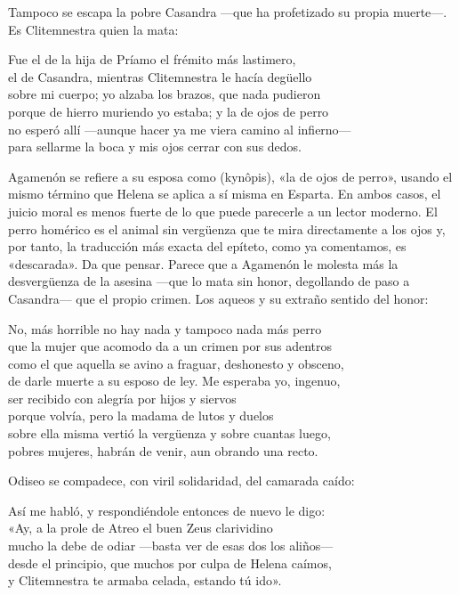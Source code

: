 Tampoco se escapa la pobre Casandra ---que ha profetizado su propia muerte---. Es Clitemnestra quien la mata:

\begin{versocita}
Fue el de la hija de Príamo el frémito más lastimero,\\
el de Casandra, mientras Clitemnestra le hacía degüello\\
sobre mi cuerpo; yo alzaba los brazos, que nada pudieron\\
porque de hierro muriendo yo estaba; y la de ojos de perro\\
no esperó allí ---aunque hacer ya me viera camino al infierno---\\
para sellarme la boca y mis ojos cerrar con sus dedos.
\end{versocita}

Agamenón se refiere a su esposa como  (kynôpis), «la de ojos de perro», usando el mismo término que Helena se aplica a sí misma en Esparta. En ambos casos, el juicio moral es menos fuerte de lo que puede parecerle a un lector moderno. El perro homérico es el animal sin vergüenza que te mira directamente a los ojos y, por tanto, la traducción más exacta del epíteto, como ya comentamos, es «descarada». Da que pensar. Parece que a Agamenón le molesta más la desvergüenza de la asesina ---que lo mata sin honor, degollando de paso a Casandra--- que el propio crimen. Los aqueos y su extraño sentido del honor:

\begin{versocita}
No, más horrible no hay nada y tampoco nada más perro\\
que la mujer que acomodo da a un crimen por sus adentros\\
como el que aquella se avino a fraguar, deshonesto y obsceno,\\
de darle muerte a su esposo de ley. Me esperaba yo, ingenuo,\\
ser recibido con alegría por hijos y siervos\\
porque volvía, pero la madama de lutos y duelos\\
sobre ella misma vertió la vergüenza y sobre cuantas luego,\\
pobres mujeres, habrán de venir, aun obrando una recto.
\end{versocita}

Odiseo se compadece, con viril solidaridad, del camarada caído:

\begin{versocita}
Así me habló, y respondiéndole entonces de nuevo le digo:\\
\stanzabreak
«Ay, a la prole de Atreo el buen Zeus clarividino\\
mucho la debe de odiar ---basta ver de esas dos los aliños---\\
desde el principio, que muchos por culpa de Helena caímos,\\
y Clitemnestra te armaba celada, estando tú ido».
\end{versocita}

